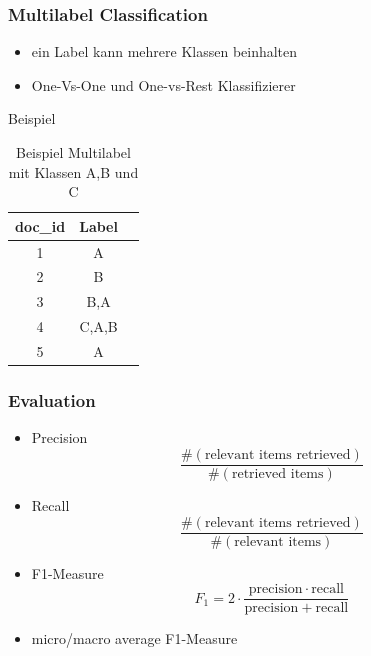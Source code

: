 \documentclass[12pt, xcolor=table]{beamer}
\begin{document}
\begin{frame}
    \frametitle{Multilabel Classification}
    \begin{itemize}
        \item ein Label kann mehrere Klassen beinhalten
        \item One-Vs-One und One-vs-Rest Klassifizierer
    \end{itemize}
    \begin{block}{Beispiel}
    \begin{center}
    \begin{table}
        \begin{tabular}{ccc}
            \tiny\textbf{doc\_id} &\tiny \textbf{Label}  \\
            \hline
            \tiny 1 &\tiny A  \\
            \tiny 2 &\tiny B  \\
            \tiny 3 &\tiny B,A  \\
            \tiny 4 &\tiny C,A,B  \\
            \tiny 5 &\tiny A  \\
        \end{tabular}
         \caption*{Beispiel Multilabel mit Klassen A,B und C}
    \end{table}
    \end{center}
    \end{block}
\end{frame}

\begin{frame}
    \frametitle{Evaluation}
    \begin{itemize}
        \item Precision \[\frac{\#(\text{relevant items retrieved})}{\#(\text{retrieved items})}\]
        \item Recall \[\frac{\#(\text{relevant items retrieved})}{\#(\text{relevant items})}\]
        \item F1-Measure \[F_1 = 2 \cdot \frac{\mathrm{precision} \cdot \mathrm{recall}}{\mathrm{precision} + \mathrm{recall}}\]
        \item micro/macro average F1-Measure
    \end{itemize}
\end{frame}
\end{document}
